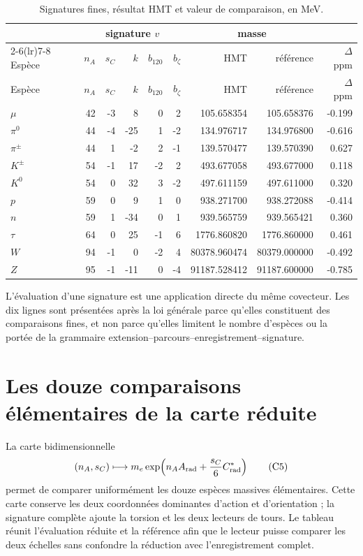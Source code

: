 \begin{longtable}{@{}lrrrrrrrr@{}}
\caption{Signatures fines, résultat HMT et valeur de comparaison, en MeV.}
\label{tab:diez-firmas-finas-rev6}\\
\toprule
&\multicolumn{5}{c}{signature \(v\)}&
\multicolumn{2}{c}{masse}&\\
\cmidrule(lr){2-6}\cmidrule(lr){7-8}
Espèce&\(n_A\)&\(s_C\)&\(k\)&\(b_{120}\)&\(b_{\zeta}\)&
{HMT}&{référence}&{\(\Delta\) ppm}\\
\midrule
\endfirsthead
\toprule
Espèce&\(n_A\)&\(s_C\)&\(k\)&\(b_{120}\)&\(b_{\zeta}\)&
{HMT}&{référence}&{\(\Delta\) ppm}\\
\midrule
\endhead
\(\mu\)&42&-3&8&0&2&105.658354&105.658376&-0.199\\
\(\pi^0\)&44&-4&-25&1&-2&134.976717&134.976800&-0.616\\
\(\pi^\pm\)&44&1&-2&2&-1&139.570477&139.570390&0.627\\
\(K^\pm\)&54&-1&17&-2&2&493.677058&493.677000&0.118\\
\(K^0\)&54&0&32&3&-2&497.611159&497.611000&0.320\\
\(p\)&59&0&9&1&0&938.271700&938.272088&-0.414\\
\(n\)&59&1&-34&0&1&939.565759&939.565421&0.360\\
\(\tau\)&64&0&25&-1&6&1776.860820&1776.860000&0.461\\
\(W\)&94&-1&0&-2&4&80378.960474&80379.000000&-0.492\\
\(Z\)&95&-1&-11&0&-4&91187.528412&91187.600000&-0.785\\
\bottomrule
\end{longtable}

L'évaluation d'une signature est une application directe du même covecteur. Les
dix lignes sont présentées après la loi générale parce qu'elles constituent des comparaisons
fines, et non parce qu'elles limitent le nombre d'espèces ou la portée de la grammaire
extension--parcours--enregistrement--signature.

\section{Les douze comparaisons élémentaires de la carte réduite}

La carte bidimensionnelle
\[
(n_A,s_C)\longmapsto
m_e\exp\!\left(n_AA_{\rm rad}+\frac{s_C}{6}C^*_{\rm rad}\right)
\tag{C5}\label{eq:carta-reducida-doce-rev6}
\]
permet de comparer uniformément les douze espèces massives élémentaires.
Cette carte conserve les deux coordonnées dominantes d'action et d'orientation ;
la signature complète ajoute la torsion et les deux lecteurs de tours. Le tableau
réunit l'évaluation réduite et la référence afin que le lecteur puisse
comparer les deux échelles sans confondre la réduction avec l'enregistrement complet.

